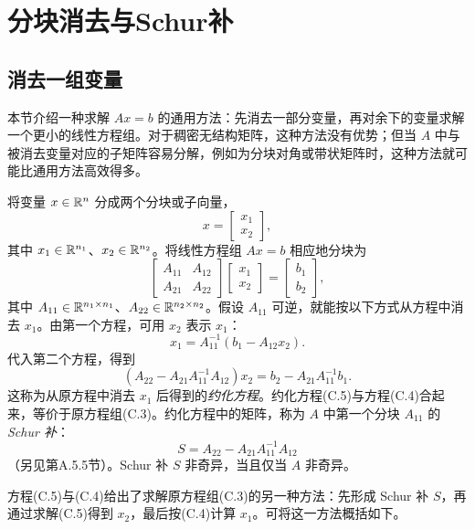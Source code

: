 \section{分块消去与Schur补}
\subsection{消去一组变量}
本节介绍一种求解 $Ax=b$ 的通用方法：先消去一部分变量，再对余下的变量求解一个更小的线性方程组。对于稠密无结构矩阵，这种方法没有优势；但当 $A$ 中与被消去变量对应的子矩阵容易分解，例如为分块对角或带状矩阵时，这种方法就可能比通用方法高效得多。

将变量 $x\in\mathbb R^n$ 分成两个分块或子向量，
\[
 x=\begin{bmatrix}x_1\\x_2\end{bmatrix},
\]
其中 $x_1\in\mathbb R^{n_1}$、$x_2\in\mathbb R^{n_2}$。将线性方程组 $Ax=b$ 相应地分块为
\begin{equation}
 \begin{bmatrix}A_{11}&A_{12}\\A_{21}&A_{22}\end{bmatrix}
 \begin{bmatrix}x_1\\x_2\end{bmatrix}=\begin{bmatrix}b_1\\b_2\end{bmatrix},\tag{C.3}
\end{equation}
其中 $A_{11}\in\mathbb R^{n_1\times n_1}$、$A_{22}\in\mathbb R^{n_2\times n_2}$。假设 $A_{11}$ 可逆，就能按以下方式从方程中消去 $x_1$。由第一个方程，可用 $x_2$ 表示 $x_1$：
\begin{equation}
 x_1=A_{11}^{-1}(b_1-A_{12}x_2).\tag{C.4}
\end{equation}
代入第二个方程，得到
\begin{equation}
 (A_{22}-A_{21}A_{11}^{-1}A_{12})x_2=b_2-A_{21}A_{11}^{-1}b_1.\tag{C.5}
\end{equation}
这称为从原方程中消去 $x_1$ 后得到的\emph{约化方程}。约化方程(C.5)与方程(C.4)合起来，等价于原方程组(C.3)。约化方程中的矩阵，称为 $A$ 中第一个分块 $A_{11}$ 的 \emph{Schur 补}：
\[
 S=A_{22}-A_{21}A_{11}^{-1}A_{12}
\]
（另见第A.5.5节）。Schur 补 $S$ 非奇异，当且仅当 $A$ 非奇异。

方程(C.5)与(C.4)给出了求解原方程组(C.3)的另一种方法：先形成 Schur 补 $S$，再通过求解(C.5)得到 $x_2$，最后按(C.4)计算 $x_1$。可将这一方法概括如下。

